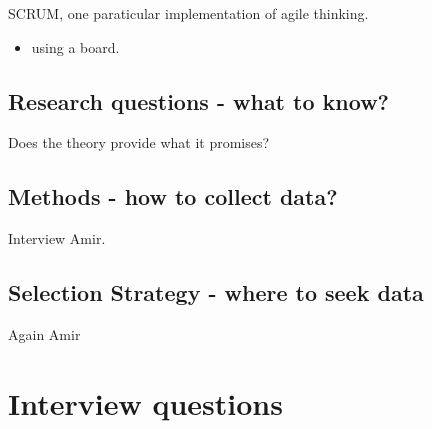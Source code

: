 \documentclass{article}
\begin{document}
SCRUM, one paraticular implementation of agile thinking.
\begin{itemize}
\item using a board.
\end{itemize}

\subsection{Research questions - what to know?}

Does the theory provide what it promises?

\subsection{Methods - how to collect data?}

Interview Amir.

\subsection{Selection Strategy - where to seek data}

Again Amir


\section{Interview questions}
\end{document}
